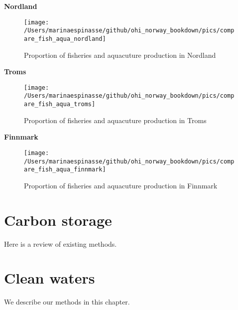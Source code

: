 \documentclass[
]{book}
\begin{document}
{\textbf{Nordland}}

\begin{figure}

{\centering \texttt{[image: /Users/marinaespinasse/github/ohi\_norway\_bookdown/pics/compare\_fish\_aqua\_nordland]} 

}

\caption{Proportion of fisheries and aquacuture production in Nordland}\label{fig:fishakva1}
\end{figure}

{\textbf{Troms}}

\begin{figure}

{\centering \texttt{[image: /Users/marinaespinasse/github/ohi\_norway\_bookdown/pics/compare\_fish\_aqua\_troms]} 

}

\caption{Proportion of fisheries and aquacuture production in Troms}\label{fig:fishakva2}
\end{figure}

{\textbf{Finnmark}}

\begin{figure}

{\centering \texttt{[image: /Users/marinaespinasse/github/ohi\_norway\_bookdown/pics/compare\_fish\_aqua\_finnmark]} 

}

\caption{Proportion of fisheries and aquacuture production in Finnmark}\label{fig:fishaakva3}
\end{figure}

\hypertarget{carbon-storage}{%
\chapter{Carbon storage}\label{carbon-storage}}

Here is a review of existing methods.

\hypertarget{clean-waters}{%
\chapter{Clean waters}\label{clean-waters}}

We describe our methods in this chapter.

  
\end{document}
